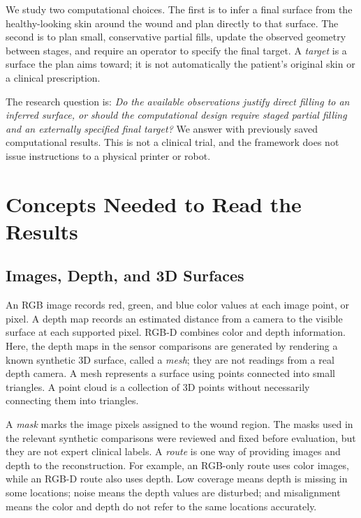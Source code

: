 \documentclass[conference]{IEEEtran}
\begin{document}
We study two computational choices. The first is to infer a final surface
from the healthy-looking skin around the wound and plan directly to that
surface. The second is to plan small, conservative partial fills, update the
observed geometry between stages, and require an operator to specify the
final target. A \emph{target} is a surface the plan aims toward; it is not
automatically the patient's original skin or a clinical prescription.

The research question is: \emph{Do the available observations justify direct
filling to an inferred surface, or should the computational design require
staged partial filling and an externally specified final target?} We answer
with previously saved computational results. This is not a clinical trial,
and the framework does not issue instructions to a physical printer or robot.

\section{Concepts Needed to Read the Results}

\subsection{Images, Depth, and 3D Surfaces}

An RGB image records red, green, and blue color values at each image point, or
pixel. A depth map records an estimated distance from a camera to the visible
surface at each supported pixel. RGB-D combines color and depth information.
Here, the depth maps in the sensor comparisons are generated by rendering a
known synthetic 3D surface, called a \emph{mesh}; they are not readings from
a real depth camera. A mesh represents a surface using points connected into
small triangles. A point cloud is a collection of 3D points without
necessarily connecting them into triangles.

A \emph{mask} marks the image pixels assigned to the wound region. The masks
used in the relevant synthetic comparisons were reviewed and fixed before
evaluation, but they are not expert clinical labels. A \emph{route} is one
way of providing images and depth to the reconstruction. For example, an
RGB-only route uses color images, while an RGB-D route also uses depth. Low
coverage means depth is missing in some locations; noise means the depth
values are disturbed; and misalignment means the color and depth do not
refer to the same locations accurately.
\end{document}
